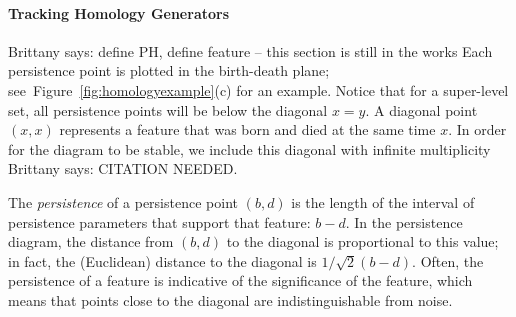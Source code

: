 \documentclass[12pt]{article}
\newcommand{\brittany}[1]{{\color{cyan} Brittany says: #1}}
\newcommand{\figref}[1]{Figure~\ref{#1}}
\begin{document}
\paragraph{Tracking Homology Generators}
\brittany{define PH, define feature -- this section is still in the works}
Each persistence point is plotted in the birth-death plane;
see~\figref{fig:homologyexample}(c) for an example.  Notice that for a
super-level set, all persistence points will be below the diagonal $x=y$.  A
diagonal point $(x,x)$ represents a feature that was born and died at the same
time $x$.  In order for the diagram to be stable, we include this diagonal with
infinite multiplicity \brittany{CITATION NEEDED}.  

The \emph{persistence} of a persistence point $(b,d)$ is the length of the
interval of persistence parameters that support that feature: $b-d$.  In the
persistence diagram, the distance from $(b,d)$ to the diagonal is proportional
to this value; in fact, the (Euclidean) distance to the diagonal is
$1/\sqrt{2}(b-d)$. Often, the persistence of a feature is indicative of the
significance of the feature, which means that points close to the diagonal are
indistinguishable from noise.
\end{document}
